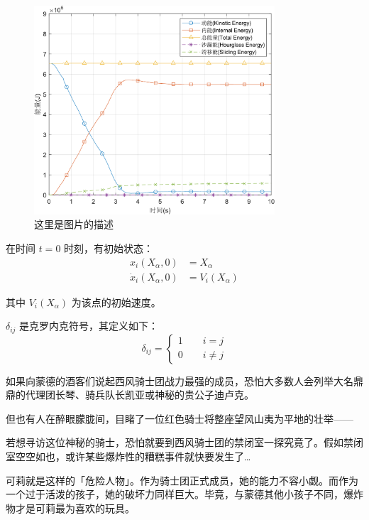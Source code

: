 \documentclass{thesis-cqjtu}
\begin{document}
\begin{figure}[htb]
    \centering
    \includegraphics[width=0.8\textwidth]{figures/energy-crop.pdf}
    \caption{这里是图片的描述}
    \label{fig:energy_a}
\end{figure}

在时间 $t=0$ 时刻，有初始状态：
\begin{align}
    x_i(X_\alpha,0) &=X_\alpha              \\
    \dot{x}_i (X_\alpha,0) &= V_i (X_\alpha)
\end{align}

其中 $V_i (X_\alpha)$ 为该点的初始速度。

$\delta_{ij}$ 是克罗内克符号，其定义如下：
\begin{equation}
    \delta_{ij} = 
    \left\{
        \begin{array}{l}
            1 \qquad i = j   \\
            0 \qquad i \neq j 
        \end{array}
    \right.
\end{equation}

如果向蒙德的酒客们说起西风骑士团战力最强的成员，恐怕大多数人会列举大名鼎鼎的代理团长琴、骑兵队长凯亚或神秘的贵公子迪卢克。

但也有人在醉眼朦胧间，目睹了一位红色骑士将整座望风山夷为平地的壮举——

若想寻访这位神秘的骑士，恐怕就要到西风骑士团的禁闭室一探究竟了。假如禁闭室空空如也，或许某些爆炸性的糟糕事件就快要发生了…

可莉就是这样的「危险人物」。作为骑士团正式成员，她的能力不容小觑。而作为一个过于活泼的孩子，她的破坏力同样巨大。毕竟，与蒙德其他小孩子不同，爆炸物才是可莉最为喜欢的玩具。
\end{document}
